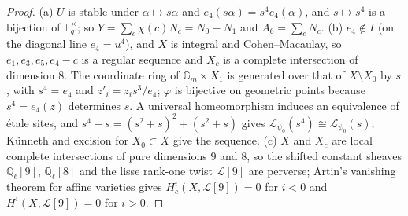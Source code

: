 \documentclass[11pt,a4paper]{amsart}
\theoremstyle{definition}
\newcommand{\F}{\mathbb{F}}
\begin{document}
\begin{proof}
(a) $U$ is stable under $\alpha\mapsto s\alpha$ and $e_4(s\alpha)=s^4e_4(\alpha)$, and $s\mapsto s^4$ is a bijection of $\F_q^\times$; so $Y=\sum_c\chi(c)N_c=N_0-N_1$ and $A_6=\sum_cN_c$. (b) $e_4\notin I$ (on the diagonal line $e_4=u^4$), and $X$ is integral and Cohen--Macaulay, so $e_1,e_3,e_5,e_4-c$ is a regular sequence and $X_c$ is a complete intersection of dimension $8$. The coordinate ring of $\mathbb G_m\times X_1$ is generated over that of $X\setminus X_0$ by $s$, with $s^4=e_4$ and $z'_i=z_is^3/e_4$; $\varphi$ is bijective on geometric points because $s^4=e_4(z)$ determines $s$. A universal homeomorphism induces an equivalence of \'etale sites, and $s^4-s=(s^2+s)^2+(s^2+s)$ gives $\mathcal L_{\psi_0}(s^4)\cong\mathcal L_{\psi_0}(s)$; K\"unneth and excision for $X_0\subset X$ give the sequence. (c) $X$ and $X_c$ are local complete intersections of pure dimensions $9$ and $8$, so the shifted constant sheaves $\mathbb Q_\ell[9]$, $\mathbb Q_\ell[8]$ and the lisse rank-one twist $\mathcal L[9]$ are perverse; Artin's vanishing theorem for affine varieties \cite[4.1.1]{BBD} gives $H^i_c(X,\mathcal L[9])=0$ for $i<0$ and $H^i(X,\mathcal L[9])=0$ for $i>0$.
\end{proof}
\end{document}
